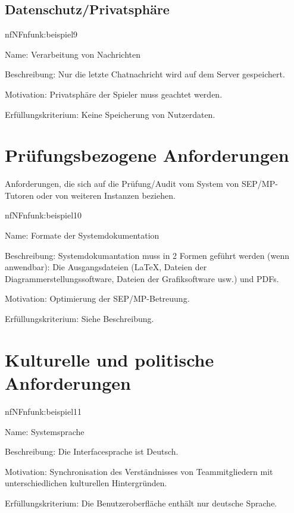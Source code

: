 \subsection{Datenschutz/Privatsphäre}

\begin{description}[leftmargin=5em, style=sameline]	
	\begin{lhp}{nf}{NF}{nfunk:beispiel9}
		\item [Name:] Verarbeitung von Nachrichten
		\item [Beschreibung:] Nur die letzte Chatnachricht wird auf dem Server gespeichert.
		\item [Motivation:] Privatsphäre der Spieler muss geachtet werden.
		\item [Erfüllungskriterium:] Keine Speicherung von Nutzerdaten.
	\end{lhp}
\end{description}

\section{Prüfungsbezogene Anforderungen}

Anforderungen, die sich auf die Prüfung/Audit vom System von SEP/MP-Tutoren oder von weiteren Instanzen beziehen.


\begin{description}[leftmargin=5em, style=sameline]	
	\begin{lhp}{nf}{NF}{nfunk:beispiel10}
		\item [Name:] Formate der Systemdokumentation
		\item [Beschreibung:] Systemdokumantation muss in 2 Formen geführt werden (wenn anwendbar): Die Ausgangsdateien (\LaTeX, Dateien der Diagrammerstellungssoftware, Dateien der Grafiksoftware usw.) und PDFs.
		\item [Motivation:] Optimierung der SEP/MP-Betreuung.
		\item [Erfüllungskriterium:] Siehe Beschreibung.
	\end{lhp}
\end{description}

\section{Kulturelle und politische Anforderungen}


\begin{description}[leftmargin=5em, style=sameline]	
	\begin{lhp}{nf}{NF}{nfunk:beispiel11}
		\item [Name:] Systemsprache
		\item [Beschreibung:] Die Interfacesprache ist Deutsch.
		\item [Motivation:] Synchronisation des Verständnisses von Teammitgliedern mit unterschiedlichen kulturellen Hintergründen.
		\item [Erfüllungskriterium:] Die Benutzeroberfläche enthält nur deutsche Sprache.
	\end{lhp}
\end{description}

